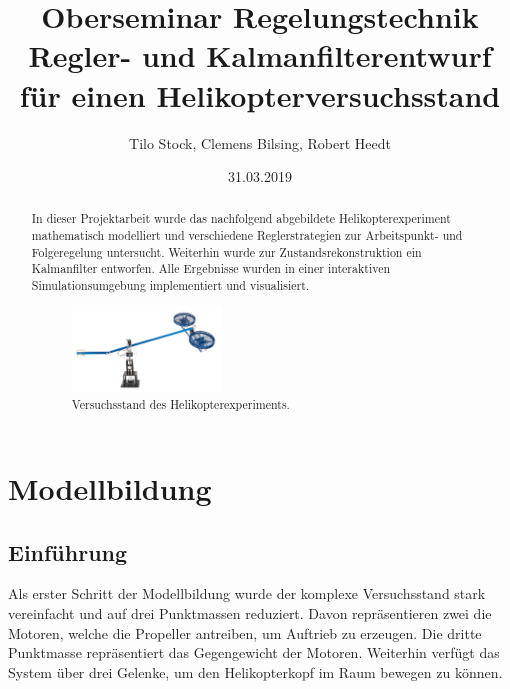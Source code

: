\documentclass[10pt,twocolumn]{article}
\begin{document}
	\fontsize{10}{11}\selectfont
	\title{Oberseminar Regelungstechnik \\ Regler- und Kalmanfilterentwurf f\"ur einen 					Helikopterversuchsstand}
	\author{Tilo Stock, Clemens Bilsing, Robert Heedt}
	\date {31.03.2019}
	
	\maketitle
	\thispagestyle{empty}
	
	\renewcommand\abstractname{Zusammenfassung}
	\begin{abstract}
		In dieser Projektarbeit wurde das nachfolgend abgebildete Helikopterexperiment mathematisch modelliert und verschiedene Reglerstrategien zur Arbeitspunkt- und Folgeregelung untersucht.
		Weiterhin wurde zur Zustandsrekonstruktion ein Kalmanfilter entworfen. Alle Ergebnisse wurden in einer interaktiven Simulationsumgebung implementiert und visualisiert.
		
		\begin{figure}[ht]
			\centering
			\includegraphics[width=0.4\textwidth]{images/Versuchstand}
			\caption{Versuchsstand des Helikopterexperiments.}
			\label{Versuchstand}
		\end{figure}
	\end{abstract}
	
	\section{Modellbildung}
	\subsection{Einführung}
	
	Als erster Schritt der Modellbildung wurde der komplexe Versuchsstand stark vereinfacht und auf drei Punktmassen reduziert.
	Davon repräsentieren zwei die Motoren, welche die Propeller antreiben, um Auftrieb zu erzeugen. Die dritte Punktmasse repräsentiert das Gegengewicht der Motoren.
	Weiterhin verfügt das System über drei Gelenke, um den Helikopterkopf im Raum bewegen zu können.
	
\end{document}
